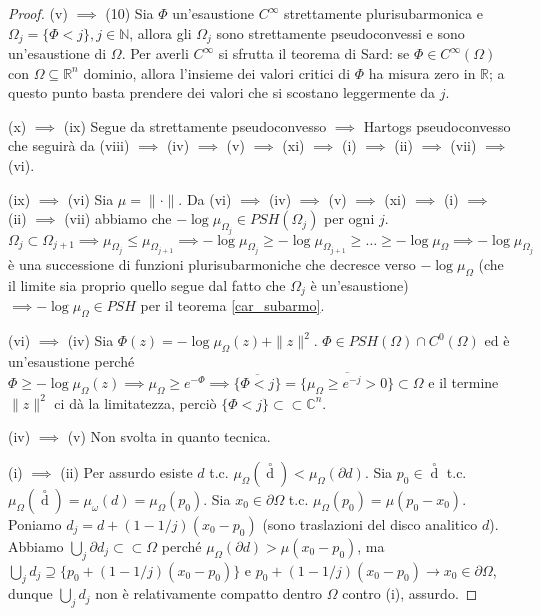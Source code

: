 \begin{proof}
  (v) $\implies$ (10) Sia $\Phi$ un'esaustione $C^{\infty}$ strettamente plurisubarmonica e $\Omega_j=\{\Phi<j\}, j \in \mathbb{N}$, allora gli $\Omega_j$ sono strettamente pseudoconvessi e sono un'esaustione di $\Omega$. Per averli $C^{\infty}$ si sfrutta il teorema di Sard: se $\Phi \in C^{\infty}(\Omega)$ con $\Omega \subseteq \mathbb{R}^n$ dominio, allora l'insieme dei valori critici di $\Phi$ ha misura zero in $\mathbb{R}$;
  a questo punto basta prendere dei valori che si scostano leggermente da $j$.

  (x) $\implies$ (ix) Segue da strettamente pseudoconvesso $\implies$ Hartogs pseudoconvesso che seguirà da (viii) $\implies$ (iv) $\implies$ (v) $\implies$ (xi) $\implies$ (i) $\implies$ (ii) $\implies$ (vii) $\implies$ (vi).

  (ix) $\implies$ (vi) Sia $\mu=\|\cdot\|$. Da (vi) $\implies$ (iv) $\implies$ (v) $\implies$ (xi) $\implies$ (i) $\implies$ (ii) $\implies$ (vii) abbiamo che $-\log{\mu_{\Omega_j}} \in PSH(\Omega_j)$ per ogni $j$.
  $\Omega_j \subset \Omega_{j+1} \implies \mu_{\Omega_j} \le \mu_{\Omega_{j+1}} \implies -\log{\mu_{\Omega_j}} \ge -\log{\mu_{\Omega_{j+1}}} \ge \dots \ge -\log{\mu_{\Omega}} \implies -\log{\mu_{\Omega_j}}$
  è una successione di funzioni plurisubarmoniche che decresce verso $-\log{\mu_{\Omega}}$ (che il limite sia proprio quello segue dal fatto che $\Omega_j$ è un'esaustione) $\implies -\log{\mu_{\Omega}} \in PSH$ per il teorema \ref{car_subarmo}.

  (vi) $\implies$ (iv) Sia $\Phi(z)=-\log{\mu_{\Omega}(z)}+\|z\|^2$. $\Phi \in PSH(\Omega)\cap C^0(\Omega)$ ed è un'esaustione perché $\Phi \ge -\log{\mu_{\Omega}(z)} \implies \mu_{\Omega} \ge e^{-\Phi} \implies \overline{\{\Phi<j\}}=\overline{\{\mu_{\Omega} \ge e^{-j}>0\}} \subset \Omega$
  e il termine $\|z\|^2$ ci dà la limitatezza, perciò $\{\Phi<j\} \subset\subset \mathbb{C}^n$.

  (iv) $\implies$ (v) Non svolta in quanto tecnica.

  (i) $\implies$ (ii) Per assurdo esiste $d$ t.c. $\mu_{\Omega}\left(\mathop {d}\limits^ \circ\right)<\mu_{\Omega}(\partial d)$. Sia $p_0 \in \mathop {d}\limits^ \circ$ t.c. $\mu_{\Omega}\left(\mathop {d}\limits^ \circ\right)=\mu_{\omega}(d)=\mu_{\Omega}(p_0)$.
  Sia $x_0 \in \partial\Omega$ t.c. $\mu_{\Omega}(p_0)=\mu(p_0-x_0)$. Poniamo $d_j=d+(1-1/j)(x_0-p_0)$ (sono traslazioni del disco analitico $d$).
  Abbiamo $\displaystyle \bigcup_j \partial d_j \subset\subset \Omega$ perché $\mu_{\Omega}(\partial d)>\mu(x_0-p_0)$, ma $\displaystyle \bigcup_j d_j \supseteq \{p_0+(1-1/j)(x_0-p_0)\}$ e $p_0+(1-1/j)(x_0-p_0) \longrightarrow x_0 \in \partial\Omega$, dunque $\displaystyle \bigcup_j d_j$ non è relativamente compatto dentro $\Omega$ contro (i), assurdo.


\end{proof}
